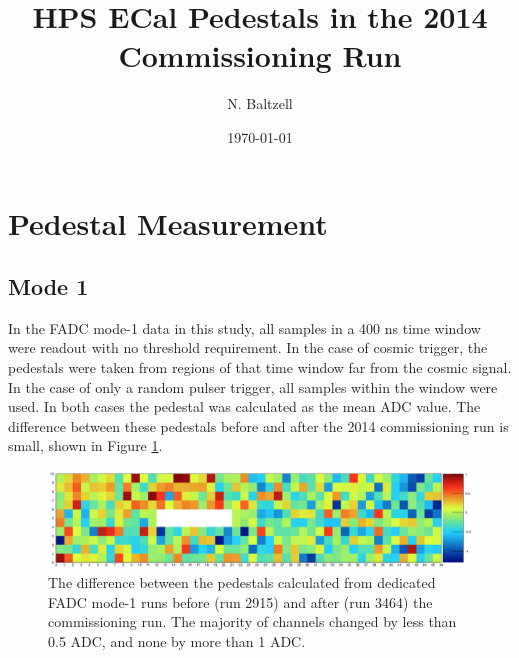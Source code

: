 \documentclass[amsmath,amssymb,notitlepage,12pt]{revtex4-1}
\begin{document}

\title{HPS ECal Pedestals in the 2014 Commissioning Run}%
\author{N. Baltzell}
\date{\today}
\maketitle

\section{Pedestal Measurement}

\subsection{Mode 1}
In the FADC mode-1 data in this study, all samples in a 400 ns time window were readout with no threshold requirement.  In the case of cosmic trigger, the pedestals were taken from regions of that time window far from the cosmic signal.  In the case of only a random pulser trigger, all samples within the window were used.  In both cases the pedestal was calculated as the mean ADC value.  The difference between these pedestals before and after the 2014 commissioning run is small, shown in Figure \ref{fig:ped_3464-2915}. 

\begin{figure}[htbp]\centering
    \includegraphics[width=17cm]{pics/ped_3464-2915.png}
    \caption{The difference between the pedestals calculated from dedicated FADC mode-1 runs before (run 2915) and after (run 3464) the commissioning run.  The majority of channels changed by less than 0.5 ADC, and none by more than 1 ADC.\label{fig:ped_3464-2915}}
\end{figure}
\end{document}
